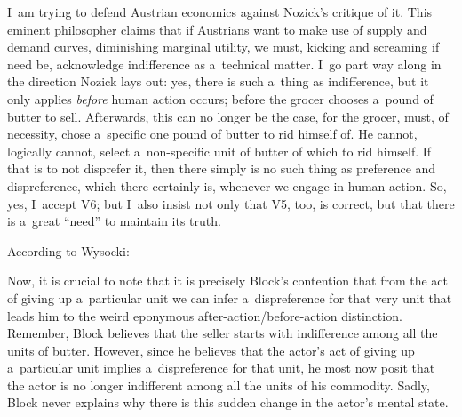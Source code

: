 I~am trying to defend Austrian economics against Nozick's 
\parencite*[][]{nozick_austrian_1977} %
 critique of it. This eminent philosopher claims that if Austrians want to make use of supply and demand curves, diminishing marginal utility, we must, kicking and screaming if need be, acknowledge indifference as a~technical matter. I~go part way along in the direction Nozick lays out: yes, there is such a~thing as indifference, but it only applies \textit{before} human action occurs; before the grocer chooses a~pound of butter to sell. Afterwards, this can no longer be the case, for the grocer, must, of necessity, chose a~specific one pound of butter to rid himself of. He cannot, logically cannot, select a~non-specific unit of butter of which to rid himself. If that is to not disprefer it, then there simply is no such thing as preference and dispreference, which there certainly is, whenever we engage in human action. So, yes, I~accept V6; but I~also insist not only that V5, too, is correct, but that there is a~great ``need'' to maintain its truth.



According to Wysocki:



Now, it is crucial to note that it is precisely Block's contention that from the act of giving up a~particular unit we can infer a~dispreference for that very unit that leads him to the weird eponymous after-action/before-action distinction. Remember, Block believes that the seller starts with indifference among all the units of butter. However, since he believes that the actor's act of giving up a~particular unit implies a~dispreference for that unit, he most now posit that the actor is no longer indifferent among all the units of his commodity. Sadly, Block never explains why there is this sudden change in the actor's mental state.



